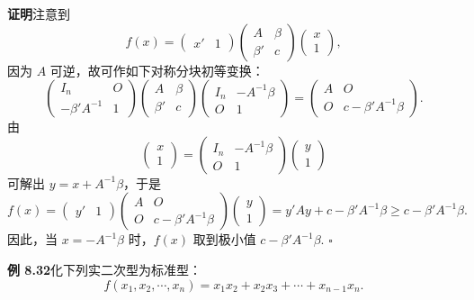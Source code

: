\documentclass[UTF8,12pt,a4paper,fontset=fandol]{ctexart}
\begin{document}
\noindent\textbf{证明}\quad 注意到
\[
f(x)=\left(\begin{array}{cc}x'&1\end{array}\right)
\left(\begin{array}{cc}
A & \beta\\
\beta' & c
\end{array}\right)
\left(\begin{array}{c}
x\\
1
\end{array}\right),
\]
因为 $A$ 可逆，故可作如下对称分块初等变换：
\[
\left(\begin{array}{cc}
I_n & O\\
-\beta'A^{-1} & 1
\end{array}\right)
\left(\begin{array}{cc}
A & \beta\\
\beta' & c
\end{array}\right)
\left(\begin{array}{cc}
I_n & -A^{-1}\beta\\
O & 1
\end{array}\right)
=
\left(\begin{array}{cc}
A & O\\
O & c-\beta'A^{-1}\beta
\end{array}\right).
\]
由
\[
\left(\begin{array}{c}
x\\
1
\end{array}\right)
=
\left(\begin{array}{cc}
I_n & -A^{-1}\beta\\
O & 1
\end{array}\right)
\left(\begin{array}{c}
y\\
1
\end{array}\right)
\]
可解出 $y=x+A^{-1}\beta$，于是
\[
f(x)=\left(\begin{array}{cc}y'&1\end{array}\right)
\left(\begin{array}{cc}
A & O\\
O & c-\beta'A^{-1}\beta
\end{array}\right)
\left(\begin{array}{c}
y\\
1
\end{array}\right)
=y'Ay+c-\beta'A^{-1}\beta\ge c-\beta'A^{-1}\beta.
\]
因此，当 $x=-A^{-1}\beta$ 时，$f(x)$ 取到极小值 $c-\beta'A^{-1}\beta$. $\ensuremath{\square}$

\noindent\textbf{例 8.32}\quad 化下列实二次型为标准型：
\[
f(x_1,x_2,\cdots,x_n)=x_1x_2+x_2x_3+\cdots+x_{n-1}x_n.
\]
\end{document}
